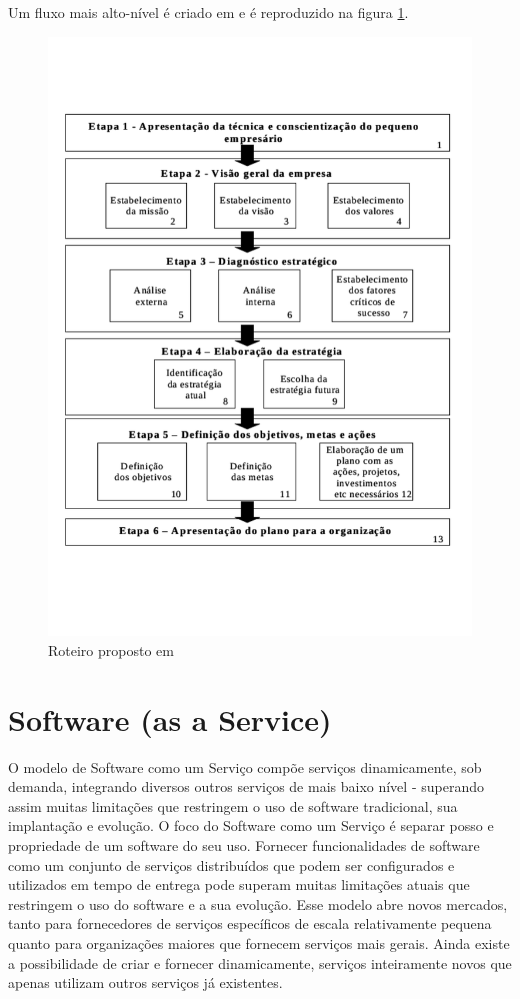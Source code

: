 \documentclass{abnt}
\begin{document}
Um fluxo mais alto-nível é criado em \cite{anaTerence} e é reproduzido na
figura \ref{RoteiroPropostoTerance}.

\begin{figure}[!htb]
	\centering
	\includegraphics[width=\textwidth]{fluxo_empresarial.pdf}
	\caption{Roteiro proposto em \cite{anaTerence}}
	\label{RoteiroPropostoTerance}
\end{figure}

\section{Software (as a Service)}

O modelo de Software como um Serviço compõe serviços dinamicamente, sob demanda,
integrando diversos outros serviços de mais baixo nível - superando assim muitas
limitações que restringem o uso de software tradicional, sua implantação e
evolução. O foco do Software como um Serviço é separar posso e propriedade de um
software do seu uso. Fornecer funcionalidades de software como um conjunto de
serviços distribuídos que podem ser configurados e utilizados em tempo de
entrega pode superam muitas limitações atuais que restringem o uso do software e
a sua evolução. Esse modelo abre novos mercados, tanto para fornecedores de
serviços específicos de escala relativamente pequena quanto para organizações
maiores que fornecem serviços mais gerais. Ainda existe a possibilidade de
criar e fornecer dinamicamente, serviços inteiramente novos que apenas utilizam
outros serviços já existentes. \cite{dubey2007delivering}
\end{document}
